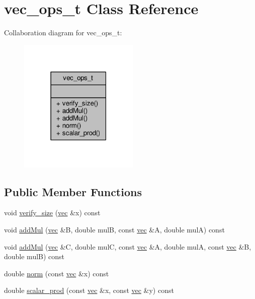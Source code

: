 \hypertarget{classvec__ops__t}{\section{vec\-\_\-ops\-\_\-t Class Reference}
\label{classvec__ops__t}
}


Collaboration diagram for vec\-\_\-ops\-\_\-t\-:
\nopagebreak
\begin{figure}[H]
\begin{center}
\leavevmode
\includegraphics[width=162pt]{classvec__ops__t__coll__graph}
\end{center}
\end{figure}
\subsection*{Public Member Functions}
\begin{DoxyCompactItemize}
\item 
void \hyperlink{classvec__ops__t_af17df64c2856fc437fb91d306cfdf715}{verify\-\_\-size} (\hyperlink{classvec}{vec} \&x) const 
\item 
void \hyperlink{classvec__ops__t_a6795455fce033219fbcd03ab320f4ddc}{add\-Mul} (\hyperlink{classvec}{vec} \&B, double mul\-B, const \hyperlink{classvec}{vec} \&A, double mul\-A) const 
\item 
void \hyperlink{classvec__ops__t_a45e5e26c8a22387a6c41e6f9baceb337}{add\-Mul} (\hyperlink{classvec}{vec} \&C, double mul\-C, const \hyperlink{classvec}{vec} \&A, double mul\-A, const \hyperlink{classvec}{vec} \&B, double mul\-B) const 
\item 
double \hyperlink{classvec__ops__t_ac036b34f65bac8438a7bb8f8d3434b2c}{norm} (const \hyperlink{classvec}{vec} \&x) const 
\item 
double \hyperlink{classvec__ops__t_a99f11fb93dee73993acfb2d4bfcd2b75}{scalar\-\_\-prod} (const \hyperlink{classvec}{vec} \&x, const \hyperlink{classvec}{vec} \&y) const 
\end{DoxyCompactItemize}


